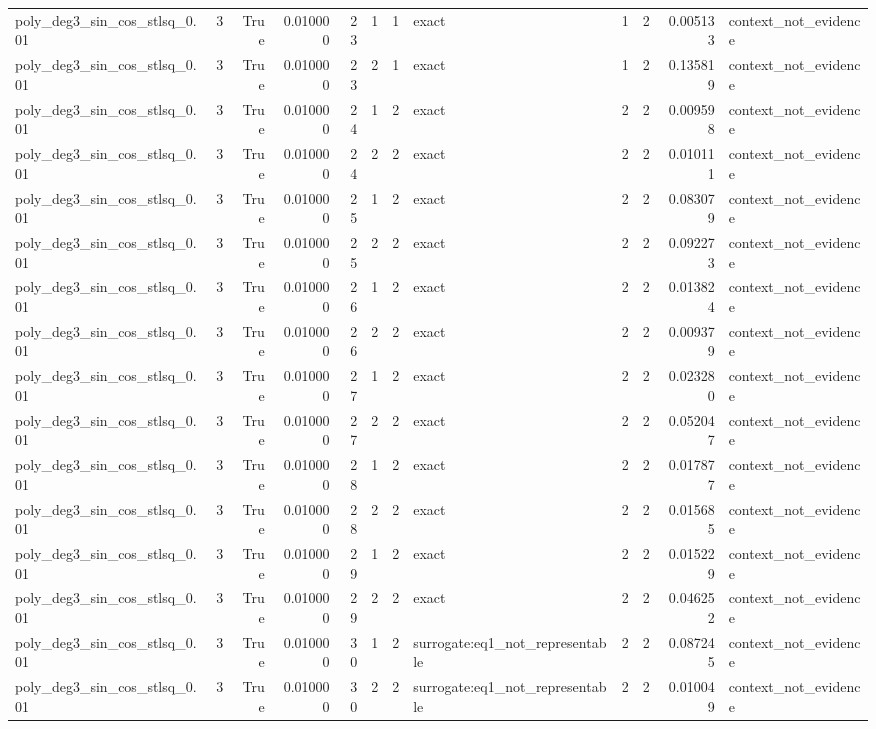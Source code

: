 \begin{tabular}{lrrrrrrlrrrl}
poly\_deg3\_sin\_cos\_stlsq\_0.01 & 3 & True & 0.010000 & 23 & 1 & 1 & exact & 1 & 2 & 0.005133 & context\_not\_evidence \\
poly\_deg3\_sin\_cos\_stlsq\_0.01 & 3 & True & 0.010000 & 23 & 2 & 1 & exact & 1 & 2 & 0.135819 & context\_not\_evidence \\
poly\_deg3\_sin\_cos\_stlsq\_0.01 & 3 & True & 0.010000 & 24 & 1 & 2 & exact & 2 & 2 & 0.009598 & context\_not\_evidence \\
poly\_deg3\_sin\_cos\_stlsq\_0.01 & 3 & True & 0.010000 & 24 & 2 & 2 & exact & 2 & 2 & 0.010111 & context\_not\_evidence \\
poly\_deg3\_sin\_cos\_stlsq\_0.01 & 3 & True & 0.010000 & 25 & 1 & 2 & exact & 2 & 2 & 0.083079 & context\_not\_evidence \\
poly\_deg3\_sin\_cos\_stlsq\_0.01 & 3 & True & 0.010000 & 25 & 2 & 2 & exact & 2 & 2 & 0.092273 & context\_not\_evidence \\
poly\_deg3\_sin\_cos\_stlsq\_0.01 & 3 & True & 0.010000 & 26 & 1 & 2 & exact & 2 & 2 & 0.013824 & context\_not\_evidence \\
poly\_deg3\_sin\_cos\_stlsq\_0.01 & 3 & True & 0.010000 & 26 & 2 & 2 & exact & 2 & 2 & 0.009379 & context\_not\_evidence \\
poly\_deg3\_sin\_cos\_stlsq\_0.01 & 3 & True & 0.010000 & 27 & 1 & 2 & exact & 2 & 2 & 0.023280 & context\_not\_evidence \\
poly\_deg3\_sin\_cos\_stlsq\_0.01 & 3 & True & 0.010000 & 27 & 2 & 2 & exact & 2 & 2 & 0.052047 & context\_not\_evidence \\
poly\_deg3\_sin\_cos\_stlsq\_0.01 & 3 & True & 0.010000 & 28 & 1 & 2 & exact & 2 & 2 & 0.017877 & context\_not\_evidence \\
poly\_deg3\_sin\_cos\_stlsq\_0.01 & 3 & True & 0.010000 & 28 & 2 & 2 & exact & 2 & 2 & 0.015685 & context\_not\_evidence \\
poly\_deg3\_sin\_cos\_stlsq\_0.01 & 3 & True & 0.010000 & 29 & 1 & 2 & exact & 2 & 2 & 0.015229 & context\_not\_evidence \\
poly\_deg3\_sin\_cos\_stlsq\_0.01 & 3 & True & 0.010000 & 29 & 2 & 2 & exact & 2 & 2 & 0.046252 & context\_not\_evidence \\
poly\_deg3\_sin\_cos\_stlsq\_0.01 & 3 & True & 0.010000 & 30 & 1 & 2 & surrogate:eq1\_not\_representable & 2 & 2 & 0.087245 & context\_not\_evidence \\
poly\_deg3\_sin\_cos\_stlsq\_0.01 & 3 & True & 0.010000 & 30 & 2 & 2 & surrogate:eq1\_not\_representable & 2 & 2 & 0.010049 & context\_not\_evidence \\

\end{tabular}
